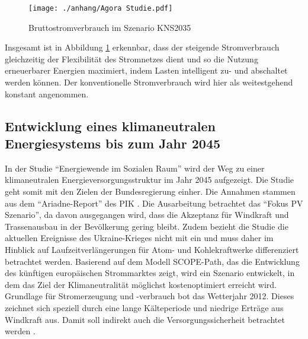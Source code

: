 		\begin{figure} [H]
			\centering
			\label{Abb. Zunahme Flexibilität} 
			\texttt{[image: ./anhang/Agora Studie.pdf]}
			\caption{Bruttostromverbrauch im Szenario KNS2035 \cite[S.33]{Agora_KlimaneutralesStromsystem}}
		\end{figure}
			
		Insgesamt ist in Abbildung \ref{Abb. Zunahme Flexibilität} erkennbar, dass der steigende Stromverbrauch gleichzeitig der Flexibilität des Stromnetzes dient und so die Nutzung erneuerbarer Energien maximiert, indem Lasten intelligent zu- und abschaltet werden können. Der konventionelle Stromverbrauch wird hier als weitestgehend konstant angenommen.
	
	\subsection{Entwicklung eines klimaneutralen Energiesystems bis zum Jahr 2045}
	
		In der Studie "`Energiewende im Sozialen Raum"' wird der Weg zu einer klimaneutralen Energieversorgungsstruktur im Jahr 2045 aufgezeigt.
		Die Studie geht somit mit den Zielen der Bundesregierung einher.
		Die Annahmen stammen aus dem "`Ariadne-Report"' des PIK \cite[S.150]{AriadneReport}.
		Die Ausarbeitung betrachtet das "`Fokus PV Szenario"', da davon ausgegangen wird, dass die Akzeptanz für Windkraft und Trassenausbau in der Bevölkerung gering bleibt.
		Zudem bezieht die Studie die aktuellen Ereignisse des Ukraine-Krieges nicht mit ein und muss daher im Hinblick auf Laufzeitverlängerungen für Atom- und Kohlekraftwerke differenziert betrachtet werden.
		Basierend auf dem Modell SCOPE-Path, das die Entwicklung des künftigen europäischen Strommarktes zeigt, wird ein Szenario entwickelt, in dem das Ziel der Klimaneutralität möglichst kostenoptimiert erreicht wird.
		Grundlage für Stromerzeugung und -verbrauch bot das Wetterjahr 2012. Dieses zeichnet sich speziell durch eine lange Kälteperiode und niedrige Erträge aus Windkraft aus. Damit soll indirekt auch die Versorgungssicherheit betrachtet werden \cite[S.2]{ESRa_Fraunhofer}. \\
		
